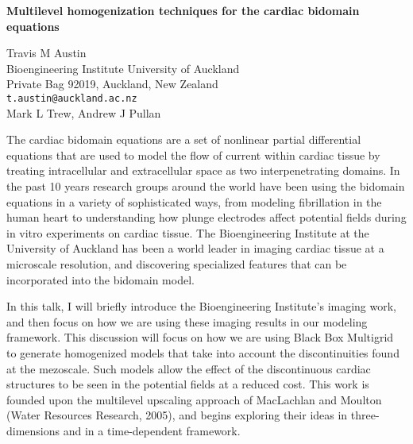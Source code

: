 \documentclass{report}
\begin{document}

\begin{center}
{\large
{\bf Multilevel homogenization techniques for the cardiac bidomain equations}}

	Travis M Austin \\
	Bioengineering Institute University of Auckland \\
	Private Bag 92019, \quad Auckland, New Zealand \\
	{\tt t.austin@auckland.ac.nz} \\
	Mark L Trew, Andrew J Pullan
\end{center}
The cardiac bidomain equations are a set of nonlinear
partial differential equations that are used to model the
flow of current within cardiac tissue by treating
intracellular and extracellular space as two
interpenetrating domains. In the past 10 years research
groups around the world have been using the bidomain
equations in a variety of sophisticated ways, from modeling
fibrillation in the human heart to understanding how plunge
electrodes affect potential fields during in vitro
experiments on cardiac tissue. The Bioengineering Institute
at the University of Auckland has been a world leader in
imaging cardiac tissue at a microscale resolution, and
discovering specialized features that can be incorporated
into the bidomain model.

In this talk, I will briefly
introduce the Bioengineering Institute's imaging work, and
then focus on how we are using these imaging results in our
modeling framework. This discussion will focus on how we
are using Black Box Multigrid to generate homogenized models
that take into account the discontinuities found at the
mezoscale. Such models allow the effect of the discontinuous
cardiac structures to be seen in the potential fields at a
reduced cost. This work is founded upon the multilevel
upscaling approach of MacLachlan and Moulton (Water
Resources Research, 2005), and begins exploring their ideas
in three-dimensions and in a time-dependent framework.



\end{document}
